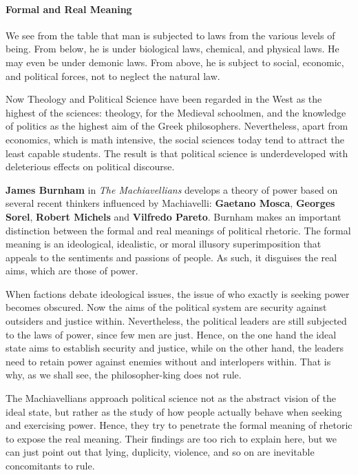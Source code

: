 \paragraph{Formal and Real Meaning}


We see from the table that man is subjected to laws from the various levels of being. From below, he is under biological laws, chemical, and physical laws. He may even be under demonic laws. From above, he is subject to social, economic, and political forces, not to neglect the natural law.

Now Theology and Political Science have been regarded in the West as the highest of the sciences: theology, for the Medieval schoolmen, and the knowledge of politics as the highest aim of the Greek philosophers. Nevertheless, apart from economics, which is math intensive, the social sciences today tend to attract the least capable students. The result is that political science is underdeveloped with deleterious effects on political discourse.

\textbf{James Burnham} in \emph{The Machiavellians} develops a theory of power based on several recent thinkers influenced by Machiavelli: \textbf{Gaetano Mosca}, \textbf{Georges Sorel}, \textbf{Robert Michels} and \textbf{Vilfredo Pareto}. Burnham makes an important distinction between the formal and real meanings of political rhetoric. The formal meaning is an ideological, idealistic, or moral illusory superimposition that appeals to the sentiments and passions of people. As such, it disguises the real aims, which are those of power.

When factions debate ideological issues, the issue of who exactly is seeking power becomes obscured. Now the aims of the political system are security against outsiders and justice within. Nevertheless, the political leaders are still subjected to the laws of power, since few men are just. Hence, on the one hand the ideal state aims to establish security and justice, while on the other hand, the leaders need to retain power against enemies without and interlopers within. That is why, as we shall see, the philosopher-king does not rule.

The Machiavellians approach political science not as the abstract vision of the ideal state, but rather as the study of how people actually behave when seeking and exercising power. Hence, they try to penetrate the formal meaning of rhetoric to expose the real meaning. Their findings are too rich to explain here, but we can just point out that lying, duplicity, violence, and so on are inevitable concomitants to rule.


